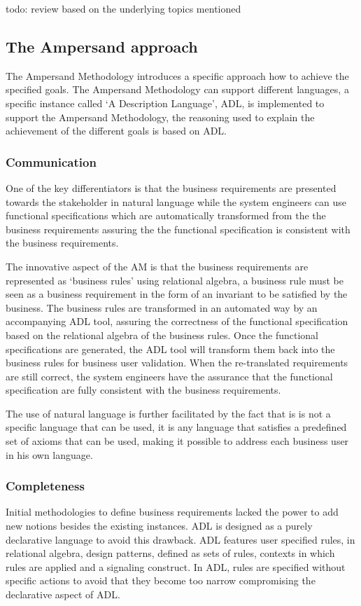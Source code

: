 todo: review based on the underlying topics mentioned

\subsection{The Ampersand approach}
The Ampersand Methodology introduces a specific approach how to achieve the specified goals. The Ampersand Methodology can support different languages, a specific instance called `A Description Language', ADL, is implemented to support the Ampersand Methodology, the reasoning used to explain the achievement of the different goals is based on ADL.

\subsubsection{Communication}

One of the key differentiators is that the business requirements are presented towards the stakeholder in natural language while the system engineers can use functional specifications which are automatically transformed from the the business requirements assuring the the functional specification is consistent with the business requirements.

The innovative aspect of the AM is that the business requirements are  represented as `business rules' using relational algebra, a business rule must be seen as a business requirement in the form of an invariant to be satisfied by the business. The business rules are transformed in an automated way by an accompanying ADL tool, assuring the correctness of the functional specification based on the relational algebra of the business rules. Once the functional specifications are generated, the ADL tool will transform them back into the business rules for business user validation. When the re-translated requirements are still correct, the system engineers have the assurance that the functional specification are fully consistent with the business requirements. 

The use of natural language is further facilitated by the fact that is is not a specific language that can be used, it is any language that satisfies a predefined set of axioms that can be used, making it possible to address each business user in his own language.

\subsubsection{Completeness}
Initial methodologies to define business requirements lacked the power to add new notions besides the existing instances. ADL is designed as a purely declarative language to avoid this drawback. ADL features user specified rules, in relational algebra, design patterns, defined as sets of rules, contexts in which rules are applied and a signaling construct. In ADL, rules are specified without specific actions to avoid that they become too narrow compromising the declarative aspect of ADL.

